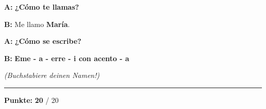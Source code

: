 \documentclass[11pt, a4paper]{article}
\newcommand{\maxpunkte}{20}
\newcommand{\lsg}[1]{\textcolor{loesung}{\textbf{#1}}}
\begin{document}
\vspace{0.5em}

\noindent
\textbf{A:} \lsg{¿Cómo te llamas?}

\vspace{0.8em}

\noindent
\textbf{B:} Me llamo \lsg{María}.

\vspace{0.8em}

\noindent
\textbf{A:} \lsg{¿Cómo se escribe?}

\vspace{0.8em}

\noindent
\textbf{B:} \lsg{Eme - a - erre - i con acento - a}

\textit{(Buchstabiere deinen Namen!)}


\vspace{20pt}
\hrule
\vspace{10pt}

\begin{flushright}
\textbf{Punkte:} \lsg{\maxpunkte} / \maxpunkte
\end{flushright}
\end{document}

